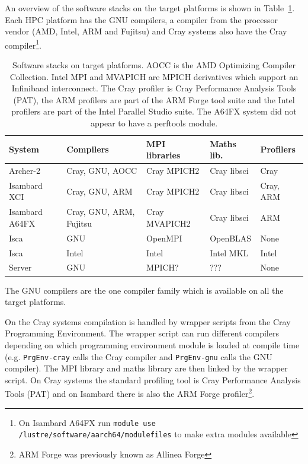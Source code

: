 \documentclass[a4paper,titlepage]{article}
\begin{document}
An overview of the software stacks on the target platforms is shown in Table~\ref{tab:software}. 
Each HPC platform has the GNU compilers, a compiler from the processor vendor (AMD, Intel, ARM and Fujitsu) and Cray systems also have the Cray compiler\footnote{On Isambard A64FX run \texttt{module use /lustre/software/aarch64/modulefiles} to make extra modules available}.
\begin{table}[htp]
\begin{center}
\begin{tabular}{|l|l|l|l|l|}
\hline 
System         & Compilers               & MPI libraries  & Maths lib.       & Profilers  \\
\hline
Archer-2       & Cray, GNU, AOCC         & Cray MPICH2     & Cray libsci     & Cray      \\
Isambard XCI   & Cray, GNU, ARM          & Cray MPICH2     & Cray libsci     & Cray, ARM \\
Isambard A64FX & Cray, GNU, ARM, Fujitsu & Cray MVAPICH2   & Cray libsci     & ARM       \\
Isca           & GNU                     & OpenMPI         & OpenBLAS        & None      \\
Isca           & Intel                   & Intel           & Intel MKL       & Intel     \\
Server         & GNU                     & MPICH?          & ???             & None      \\
\hline
\end{tabular}
\end{center}
\caption{Software stacks on target platforms. AOCC is the AMD Optimizing Compiler Collection. Intel MPI and MVAPICH are MPICH derivatives which support an Infiniband interconnect.
The Cray profiler is Cray Performance Analysis Tools (PAT), the ARM profilers are part of the ARM Forge tool suite and the Intel profilers are part of the Intel Parallel Studio suite.
The A64FX system did not appear to have a perftools module.}
\label{tab:software}
\end{table}
The GNU compilers are the one compiler family which is available on all the target platforms.

On the Cray systems compilation is handled by wrapper scripts from the Cray Programming Environment. The wrapper script can run different compilers depending on which programming environment module is loaded at compile time (e.g. \texttt{PrgEnv-cray} calls the Cray compiler and \texttt{PrgEnv-gnu} calls the GNU compiler). The MPI library and maths library are then linked by the wrapper script. On Cray systems the standard profiling tool is Cray Performance Analysis Tools (PAT) and on Isambard there is also the ARM Forge profiler\footnote{ARM Forge was previously known as Allinea Forge}.
\end{document}
